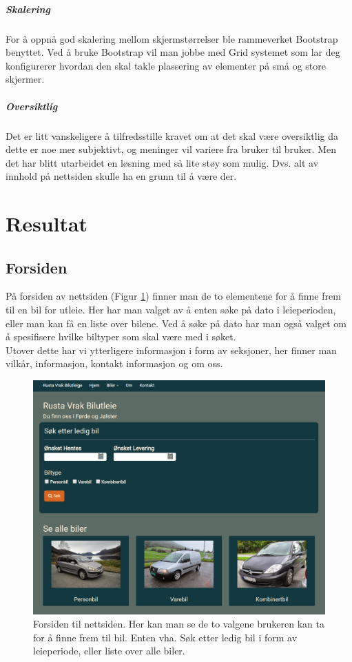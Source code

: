 \subparagraph*{Skalering}
For å oppnå god skalering mellom skjermstørrelser ble rammeverket Bootstrap benyttet. Ved å bruke Bootstrap vil man jobbe med Grid systemet som lar deg konfigurerer hvordan den skal takle plassering av elementer på små og store skjermer. 

\subparagraph*{Oversiktlig}
Det er litt vanskeligere å tilfredsstille kravet om at det skal være oversiktlig da dette er noe mer subjektivt, og meninger vil variere fra bruker til bruker. Men det har blitt utarbeidet en løsning med så lite støy som mulig. Dvs. alt av innhold på nettsiden skulle ha en grunn til å være der. 

\newpage
\section{Resultat}

\subsection{Forsiden}
På forsiden av nettsiden (Figur \ref{fig:rv_frontpage}) finner man de to elementene for å finne frem til en bil for utleie. Her har man valget av å enten søke på dato i leieperioden, eller man kan få en liste over bilene. Ved å søke på dato har man også valget om å spesifisere hvilke biltyper som skal være med i søket. \\

Utover dette har vi ytterligere informasjon i form av seksjoner, her finner man vilkår, informasjon, kontakt informasjon og om oss.

 \begin{figure}[htbp]
	\centering
		\includegraphics[scale=0.4]{Bilder/rv_frontpage.png}
	\caption[Forsiden til Nettsiden]{Forsiden til nettsiden. Her kan man se de to valgene brukeren kan ta for å finne frem til bil. Enten vha. Søk etter ledig bil i form av leieperiode, eller liste over alle biler. } %
	\label{fig:rv_frontpage}
\end{figure}



